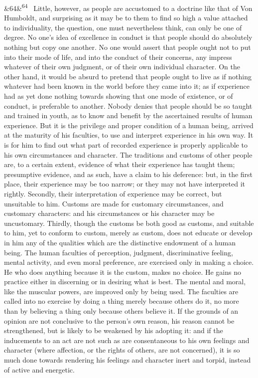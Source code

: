 \documentclass[12pt]{article}
\newcommand{\para}[1][]{\par\noindent\ifx&#1&\else\textsuperscript{\footnotesize #1}~\fi}
\begin{document}
\para[64] Little, however, as people are accustomed to a doctrine like that of Von Humboldt, and surprising as it may be to them to find so high a value attached to individuality, the question, one must nevertheless think, can only be one of degree. No one's idea of excellence in conduct is that people should do absolutely nothing but copy one another. No one would assert that people ought not to put into their mode of life, and into the conduct of their concerns, any impress whatever of their own judgment, or of their own individual character. On the other hand, it would be absurd to pretend that people ought to live as if nothing whatever had been known in the world before they came into it; as if experience had as yet done nothing towards showing that one mode of existence, or of conduct, is preferable to another. Nobody denies that people should be so taught and trained in youth, as to know and benefit by the ascertained results of human experience. But it is the privilege and proper condition of a human being, arrived at the maturity of his faculties, to use and interpret experience in his own way. It is for him to find out what part of recorded experience is properly applicable to his own circumstances and character. The traditions and customs of other people are, to a certain extent, evidence of what their experience has taught them; presumptive evidence, and as such, have a claim to his deference: but, in the first place, their experience may be too narrow; or they may not have interpreted it rightly. Secondly, their interpretation of experience may be correct, but unsuitable to him. Customs are made for customary circumstances, and customary characters: and his circumstances or his character may be uncustomary. Thirdly, though the customs be both good as customs, and suitable to him, yet to conform to custom, merely as custom, does not educate or develop in him any of the qualities which are the distinctive endowment of a human being. The human faculties of perception, judgment, discriminative feeling, mental activity, and even moral preference, are exercised only in making a choice. He who does anything because it is the custom, makes no choice. He gains no practice either in discerning or in desiring what is best. The mental and moral, like the muscular powers, are improved only by being used. The faculties are called into no exercise by doing a thing merely because others do it, no more than by believing a thing only because others believe it. If the grounds of an opinion are not conclusive to the person's own reason, his reason cannot be strengthened, but is likely to be weakened by his adopting it: and if the inducements to an act are not such as are consentaneous to his own feelings and character (where affection, or the rights of others, are not concerned), it is so much done towards rendering his feelings and character inert and torpid, instead of active and energetic.
\end{document}
